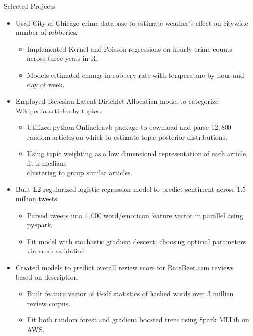 \documentclass{resume} %
\begin{document}

\begin{rSection}{Selected Projects}
    \begin{itemize}
        \item Used City of Chicago crime database to estimate weather's effect on citywide number of robberies.
            \begin{itemize} 
                \item Implemented Kernel and Poisson regressions on hourly crime counts across three years in R.
                \item Models estimated change in robbery rate with temperature by hour and day of week.
            \end{itemize}
        \item Employed Bayesian Latent Dirichlet Allocation model to categorize Wikipedia articles by topics.
            \begin{itemize} 
                \item Utilized python Onlineldavb package to download and parse $12,\!800$ random articles on which to estimate topic posterior distributions.   
                \item Using topic weighting as a low dimensional representation of each article, fit k-medians \\clustering to group similar articles.
            \end{itemize}
        \item Built L2 regularized logistic regression model to predict sentiment across $1.5$ million tweets.
            \begin{itemize} 
                \item Parsed tweets into $4,\!000$ word/emoticon feature vector in parallel using pyspark.
                \item Fit model with stochastic gradient descent, choosing optimal parameters via cross validation.
            \end{itemize}
        \item Created models to predict overall review score for RateBeer.com reviews based on description.
            \begin{itemize} 
                \item Built feature vector of tf-idf statistics of hashed words over 3 million review corpus.
                \item Fit both random forest and gradient boosted trees using Spark MLLib on AWS.
            \end{itemize}

    \end{itemize} 
\end{rSection}
\end{document}

